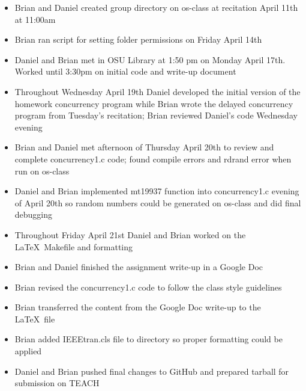 \documentclass[10pt,letterpaper,draftclsnofoot,onecolumn]{IEEEtran}
\begin{document}
\begin{itemize}
\item Brian and Daniel created group directory on os-class at recitation April 11th at 11:00am
\item Brian ran script for setting folder permissions on Friday April 14th
\item Daniel and Brian met in OSU Library at 1:50 pm on Monday April 17th. Worked until 3:30pm on initial code and write-up document
\item Throughout Wednesday April 19th Daniel developed the initial version of the homework concurrency program while Brian wrote the delayed concurrency program from Tuesday's recitation; Brian reviewed Daniel's code Wednesday evening
\item Brian and Daniel met afternoon of Thursday April 20th to review and complete concurrency1.c code; found compile errors and rdrand error when run on os-class
\item Daniel and Brian implemented mt19937 function into concurrency1.c evening of April 20th so random numbers could be generated on os-class and did final debugging
\item Throughout Friday April 21st Daniel and Brian worked on the \LaTeX\ Makefile and formatting
\item Brian and Daniel finished the assignment write-up in a Google Doc
\item Brian revised the concurrency1.c code to follow the class style guidelines
\item Brian transferred the content from the Google Doc write-up to the \LaTeX\ file
\item Brian added IEEEtran.cls file to directory so proper formatting could be applied
\item Daniel and Brian pushed final changes to GitHub and prepared tarball for submission on TEACH
\end{itemize}
\end{document}
